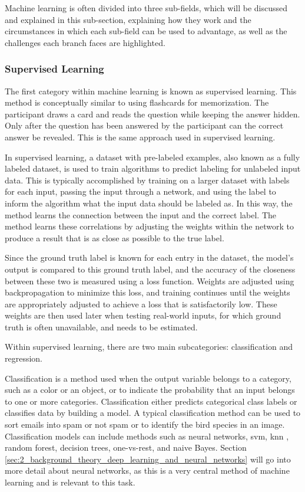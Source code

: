     Machine learning is often divided into three sub-fields, which will be discussed and explained in this sub-section, explaining how they work and the circumstances in which each sub-field can be used to advantage, as well as the challenges each branch faces are highlighted.

        \subsubsection{Supervised Learning}

        The first category within machine learning is known as supervised learning. This method is conceptually similar to using flashcards for memorization.
        The participant draws a card and reads the question while keeping the answer hidden. Only after the question has been answered by the participant can the correct answer be revealed. This is the same approach used in supervised learning.
        
        
        In supervised learning, a dataset with pre-labeled examples, also known as a fully labeled dataset, is used to train algorithms to predict labeling for unlabeled input data. This is typically accomplished by training on a larger dataset with labels for each input, passing the input through a network, and using the label to inform the algorithm what the input data should be labeled as. In this way, the method learns the connection between the input and the correct label. The method learns these correlations by adjusting the weights within the network to produce a result that is as close as possible to the true label.
        
        Since the ground truth label is known for each entry in the dataset, the model's output is compared to this ground truth label, and the accuracy of the closeness between these two is measured using a loss function. Weights are adjusted using backpropagation to minimize this loss, and training continues until the weights are appropriately adjusted to achieve a loss that is satisfactorily low. These weights are then used later when testing real-world inputs, for which ground truth is often unavailable, and needs to be estimated.
        
        Within supervised learning, there are two main subcategories: classification and regression. 
        
        Classification is a method used when the output variable belongs to a category, such as a color or an object, or to indicate the probability that an input belongs to one or more categories. Classification either predicts categorical class labels or classifies data by building a model. A typical classification method can be used to sort emails into spam or not spam or to identify the bird species in an image. Classification models can include methods such as neural networks, \gls{svm}, \gls{knn} \cite{fixDiscriminatoryAnalysisNonparametric1989, coverNearestNeighborPattern1967}, random forest, decision trees, one-vs-rest, and naive Bayes. Section \ref{sec:2_background_theory_deep_learning_and_neural_networks} will go into more detail about neural networks, as this is a very central method of machine learning and is relevant to this task.
        
